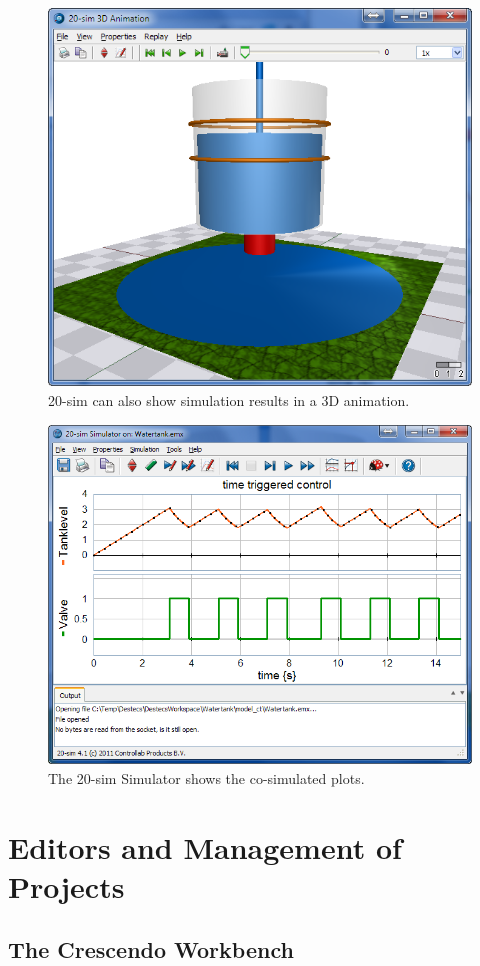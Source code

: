 \documentclass{crescendorepchap}
\begin{document}
\begin{figure}[htbp]
\centering
\includegraphics[width=.9\textwidth]{images/20simAnimationWaterTank.png}
\caption{20-sim can also show simulation results in a 3D animation.\label{fig:water3Dani}}
\end{figure}


\begin{figure}[htbp]
\centering
\includegraphics[width=.6\textwidth]{images/20simSimulatorWaterTank.png}
\caption{The 20-sim Simulator shows the co-simulated plots.\label{fig:watercosimplot}}
\end{figure}

\chapter{Editors and Management of Projects}\label{chap:basic}

\section{The Crescendo Workbench}\label{sec:crescendo}
\end{document}
